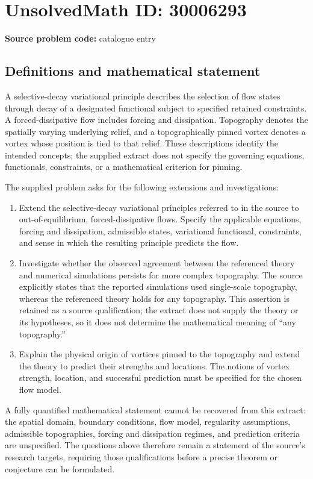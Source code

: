 \documentclass[11pt]{article}
\begin{document}
\section*{UnsolvedMath ID: 30006293}
\textbf{Source problem code:} catalogue entry
\subsection{Definitions and mathematical statement}
A selective-decay variational principle describes the selection of flow states through decay of a designated functional subject to specified retained constraints. A forced-dissipative flow includes forcing and dissipation. Topography denotes the spatially varying underlying relief, and a topographically pinned vortex denotes a vortex whose position is tied to that relief. These descriptions identify the intended concepts; the supplied extract does not specify the governing equations, functionals, constraints, or a mathematical criterion for pinning.

The supplied problem asks for the following extensions and investigations:
\begin{enumerate}
\item Extend the selective-decay variational principles referred to in the source to out-of-equilibrium, forced-dissipative flows. Specify the applicable equations, forcing and dissipation, admissible states, variational functional, constraints, and sense in which the resulting principle predicts the flow.
\item Investigate whether the observed agreement between the referenced theory and numerical simulations persists for more complex topography. The source explicitly states that the reported simulations used single-scale topography, whereas the referenced theory holds for any topography. This assertion is retained as a source qualification; the extract does not supply the theory or its hypotheses, so it does not determine the mathematical meaning of ``any topography.''
\item Explain the physical origin of vortices pinned to the topography and extend the theory to predict their strengths and locations. The notions of vortex strength, location, and successful prediction must be specified for the chosen flow model.
\end{enumerate}
A fully quantified mathematical statement cannot be recovered from this extract: the spatial domain, boundary conditions, flow model, regularity assumptions, admissible topographies, forcing and dissipation regimes, and prediction criteria are unspecified. The questions above therefore remain a statement of the source's research targets, requiring those qualifications before a precise theorem or conjecture can be formulated.
\end{document}
